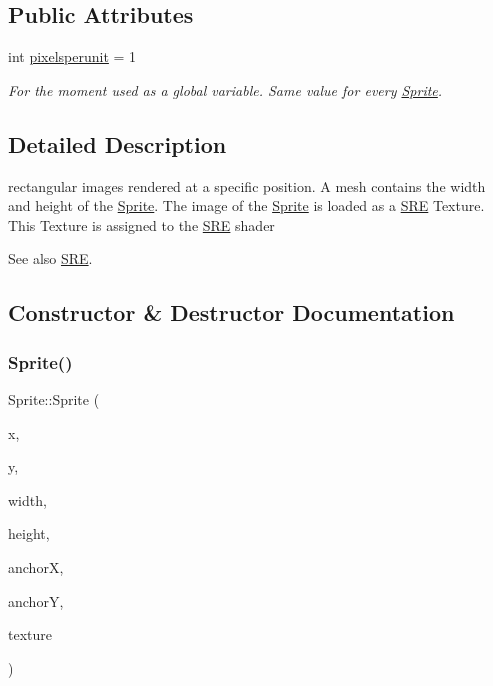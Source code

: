 \subsection*{Public Attributes}
\begin{DoxyCompactItemize}
\item 
int \hyperlink{class_mason_1_1_sprite_a5d5ba8a72349d94bbe9190efcb9715cc}{pixelsperunit} = 1
\begin{DoxyCompactList}\small\item\em For the moment used as a global variable. Same value for every \hyperlink{class_mason_1_1_sprite}{Sprite}. \end{DoxyCompactList}\end{DoxyCompactItemize}


\subsection{Detailed Description}
rectangular images rendered at a specific position. A mesh contains the width and height of the \hyperlink{class_mason_1_1_sprite}{Sprite}. The image of the \hyperlink{class_mason_1_1_sprite}{Sprite} is loaded as a \hyperlink{namespace_s_r_e}{S\+RE} Texture. This Texture is assigned to the \hyperlink{namespace_s_r_e}{S\+RE} shader 

\begin{DoxySeeAlso}{See also}
\hyperlink{namespace_s_r_e}{S\+RE}. 
\end{DoxySeeAlso}


\subsection{Constructor \& Destructor Documentation}
\hypertarget{class_mason_1_1_sprite_a40dbab8285c1d3bdc95dfe1806736402}{}\label{class_mason_1_1_sprite_a40dbab8285c1d3bdc95dfe1806736402} 
\subsubsection{\texorpdfstring{Sprite()}{Sprite()}}
{\footnotesize\ttfamily Sprite\+::\+Sprite (\begin{DoxyParamCaption}\item[{int}]{x,  }\item[{int}]{y,  }\item[{int}]{width,  }\item[{int}]{height,  }\item[{float}]{anchorX,  }\item[{float}]{anchorY,  }\item[{std\+::shared\+\_\+ptr$<$ S\+R\+E\+::\+Texture $>$}]{texture }\end{DoxyParamCaption})}



